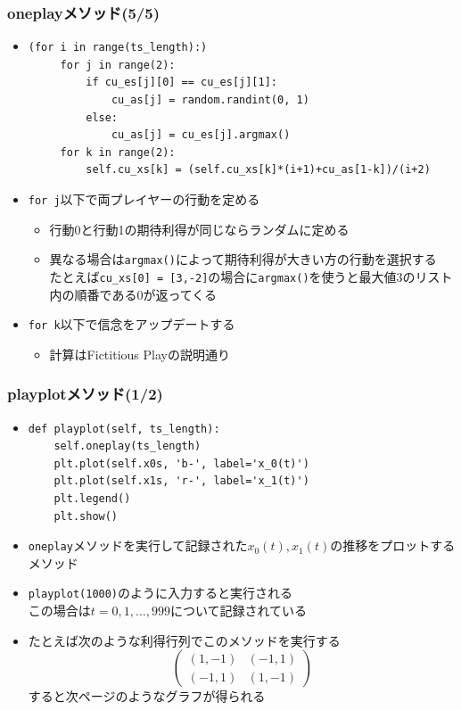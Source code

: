 \documentclass[dvipdfmx,fleqn,handout]{beamer}
\begin{document}
\begin{frame}[fragile]%
\frametitle{oneplayメソッド(5/5)}
\begin{itemize}\setlength{\parskip}{0.5em}
\item
\footnotesize
\begin{verbatim}
(for i in range(ts_length):)
     for j in range(2):
         if cu_es[j][0] == cu_es[j][1]:
             cu_as[j] = random.randint(0, 1)
         else:
             cu_as[j] = cu_es[j].argmax()
     for k in range(2):
         self.cu_xs[k] = (self.cu_xs[k]*(i+1)+cu_as[1-k])/(i+2)
\end{verbatim}\pause
\normalsize
\item
\verb|for j|以下で両プレイヤーの行動を定める
 \begin{itemize}\setlength{\parskip}{0.5em}\pause
 \item
行動0と行動1の期待利得が同じならランダムに定める\pause
 \item
異なる場合は\verb|argmax()|によって期待利得が大きい方の行動を選択する\pause\\
たとえば\verb|cu_xs[0] = [3,-2]|の場合に\verb|argmax()|を使うと最大値3のリスト内の順番である0が返ってくる\pause
\end{itemize}
\item
\verb|for k|以下で信念をアップデートする
\begin{itemize}\setlength{\parskip}{0.5em}
\item
計算はFictitious Playの説明通り
\end{itemize}
\end{itemize}
\end{frame}

\begin{frame}[fragile]%
\frametitle{playplotメソッド(1/2)}
\begin{itemize}\setlength{\parskip}{0.5em}
\item
\footnotesize
\begin{verbatim}
def playplot(self, ts_length):
    self.oneplay(ts_length)
    plt.plot(self.x0s, 'b-', label='x_0(t)')
    plt.plot(self.x1s, 'r-', label='x_1(t)')
    plt.legend()
    plt.show()
\end{verbatim}
\normalsize
\pause
\item
\verb|oneplay|メソッドを実行して記録された$x_0(t),x_1(t)$の推移をプロットするメソッド\pause
\item
\verb|playplot(1000)|のように入力すると実行される\pause\\
この場合は$t=0,1,\dots,999$について記録されている\pause
\item
たとえば次のような利得行列でこのメソッドを実行する
\footnotesize
\begin{equation*}
\begin{pmatrix}
(1,-1) & (-1,1)\\
(-1,1) & (1,-1)
\end{pmatrix}
\end{equation*}\pause
\normalsize
すると次ページのようなグラフが得られる
\end{itemize}
\end{frame}
\end{document}
